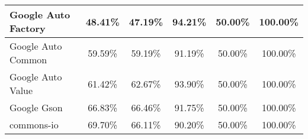 \documentclass[../main]{subfiles}
\begin{document}
\begin{table}[htb]
\begin{tabular}{|l|c|c|c|c|c|}
Google Auto Factory           & 48.41\%                                                                                 & 47.19\%                                                                                     & 94.21\%                                                                              & 50.00\%                                                                               & 100.00\%                                                                             \\ \hline
Google Auto Common            & 59.59\%                                                                                 & 59.19\%                                                                                     & 91.19\%                                                                              & 50.00\%                                                                               & 100.00\%                                                                             \\ \hline
Google Auto Value             & 61.42\%                                                                                 & 62.67\%                                                                                     & 93.90\%                                                                              & 50.00\%                                                                               & 100.00\%                                                                             \\ \hline
Google Gson                   & 66.83\%                                                                                 & 66.46\%                                                                                     & 91.75\%                                                                              & 50.00\%                                                                               & 100.00\%                                                                             \\ \hline
commons-io                    & 69.70\%                                                                                 & 66.11\%                                                                                     & 90.20\%                                                                              & 50.00\%                                                                               & 100.00\%                                                                             \\ \hline

\end{tabular}
\end{table}
\end{document}
